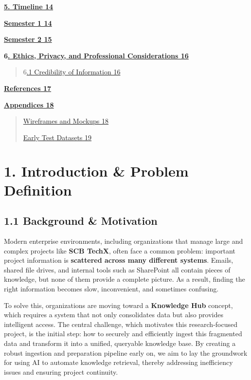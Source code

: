 \documentclass[12pt]{article}
\begin{document}
\hyperref[timeline]{\textbf{5. Timeline 14}}

\hyperref[semester-1]{\textbf{Semester 1 14}}

\hyperref[semester-2]{\textbf{Semester 2 15}}

\textbf{6\hyperref[ethics-privacy-and-professional-considerations]{.
Ethics, Privacy, and Professional Considerations 16}}

\begin{quote}
6\hyperref[credibility-of-information]{.1 Credibility of Information 16}
\end{quote}

\hyperref[references]{\textbf{References 17}}

\hyperref[appendices]{\textbf{Appendices 18}}

\begin{quote}
\hyperref[wireframes-and-mockups]{Wireframes and Mockups 18}

\hyperref[early-test-datasets]{Early Test Datasets 19}
\end{quote}

\section{\texorpdfstring{\hfill\break
}{ }}\label{section-1}

\section{1. Introduction \& Problem
Definition}\label{introduction-problem-definition}

\subsection{1.1 Background \& Motivation}\label{background-motivation}

Modern enterprise environments, including organizations that manage
large and complex projects like \textbf{SCB TechX}, often face a common
problem: important project information is \textbf{scattered across many
different systems}. Emails, shared file drives, and internal tools such
as SharePoint all contain pieces of knowledge, but none of them provide
a complete picture. As a result, finding the right information becomes
slow, inconvenient, and sometimes confusing.

To solve this, organizations are moving toward a \textbf{Knowledge Hub}
concept, which requires a system that not only consolidates data but
also provides intelligent access. The central challenge, which motivates
this research-focused project, is the initial step: how to securely and
efficiently ingest this fragmented data and transform it into a unified,
queryable knowledge base. By creating a robust ingestion and preparation
pipeline early on, we aim to lay the groundwork for using AI to automate
knowledge retrieval, thereby addressing inefficiency issues and ensuring
project continuity.
\end{document}
